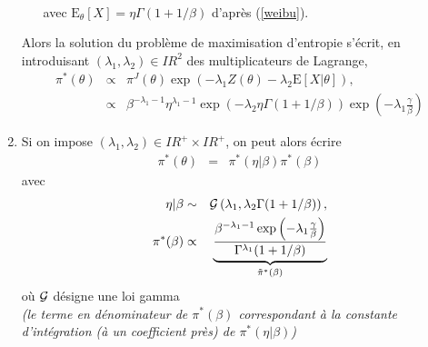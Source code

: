 \documentclass[10pt]{article}
\newcommand{\R}{I\!\!R}
\newcommand{\E}{\mbox{E}}
\newcommand{\1}{\mathbbm{1}}
\begin{document}
\begin{enumerate}
\begin{enumerate}
\begin{eqnarray}
\end{eqnarray}
avec $\E_{\theta}[X]=\eta\Gamma(1+1/\beta)$ d'après (\ref{weibu}). 
\end{enumerate}
Alors la solution du problème de maximisation d'entropie s'écrit, en introduisant $(\lambda_1,\lambda_2)\in\R^2$ des multiplicateurs de Lagrange,
\begin{eqnarray*}
\pi^*(\theta) & \propto & \pi^J(\theta) \exp\left(-\lambda_1 Z(\theta) - \lambda_2\E[X|\theta]\right), \\
& \propto &  \beta^{-\lambda_1-1} \eta^{\lambda_1-1} \exp\left(-\lambda_2 \eta\Gamma(1+1/\beta)\right) \exp\left(-\lambda_1 \frac{\gamma}{\beta}\right)
\end{eqnarray*}
\item Si on impose $(\lambda_1,\lambda_2)\in\R^+\times \R^+$, on peut alors écrire
\begin{eqnarray*}
\pi^*(\theta) & = & \pi^*(\eta|\beta)\pi^*(\beta)
\end{eqnarray*}
avec
\begin{eqnarray*}
\eta|\beta & \sim & {\cal{G}}\left(\lambda_1,\lambda_2 \Gamma(1+1/\beta)\right), \\
\pi^*(\beta) & \propto & \underbrace{\frac{\beta^{-\lambda_1-1}\exp\left(-\lambda_1 \frac{\gamma}{\beta}\right)}{\Gamma^{\lambda_1}(1+1/\beta)}}_{\tilde{\pi}^*(\beta)}
\end{eqnarray*}
où ${\cal{G}}$ désigne une loi gamma \\
{\it (le terme en dénominateur de $\pi^*(\beta)$ correspondant à la constante d'intégration (à un coefficient près) de $\pi^*(\eta|\beta)$)}


\end{enumerate}
\end{document}

